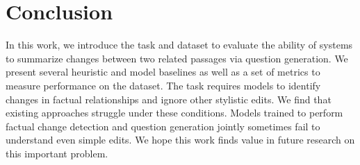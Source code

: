 \section{Conclusion}
In this work, we introduce the \dataset{} task and dataset to evaluate the ability of \nlp{} systems to summarize changes between two related passages via question generation. We present several heuristic and model baselines as well as a set of metrics to measure performance on the dataset. The \dataset{} task requires models to identify changes in factual relationships and ignore other stylistic edits. We find that existing approaches struggle under these conditions. Models trained to perform factual change detection and question generation jointly sometimes fail to understand even simple edits. We hope this work finds value in future research on this important problem.


